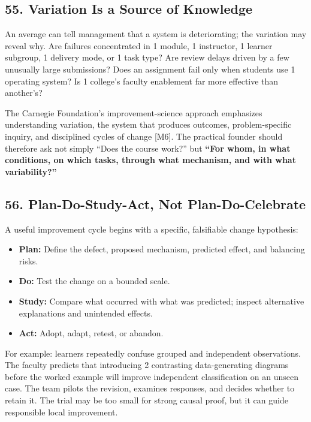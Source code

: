 \subsection*{55. Variation Is a Source of Knowledge}

An average can tell management that a system is deteriorating; the variation may reveal why. Are failures concentrated in 1 module, 1 instructor, 1 learner subgroup, 1 delivery mode, or 1 task type? Are review delays driven by a few unusually large submissions? Does an assignment fail only when students use 1 operating system? Is 1 college's faculty enablement far more effective than another's?

The Carnegie Foundation's improvement-science approach emphasizes understanding variation, the system that produces outcomes, problem-specific inquiry, and disciplined cycles of change [M6]. The practical founder should therefore ask not simply ``Does the course work?'' but \textbf{``For whom, in what conditions, on which tasks, through what mechanism, and with what variability?''}

\subsection*{56. Plan-Do-Study-Act, Not Plan-Do-Celebrate}

A useful improvement cycle begins with a specific, falsifiable change hypothesis:

\begin{itemize}[leftmargin=1.5em, itemsep=0.4em]
    \item \textbf{Plan:} Define the defect, proposed mechanism, predicted effect, and balancing risks.
    \item \textbf{Do:} Test the change on a bounded scale.
    \item \textbf{Study:} Compare what occurred with what was predicted; inspect alternative explanations and unintended effects.
    \item \textbf{Act:} Adopt, adapt, retest, or abandon.
\end{itemize}

For example: learners repeatedly confuse grouped and independent observations. The faculty predicts that introducing 2 contrasting data-generating diagrams before the worked example will improve independent classification on an unseen case. The team pilots the revision, examines responses, and decides whether to retain it. The trial may be too small for strong causal proof, but it can guide responsible local improvement.

